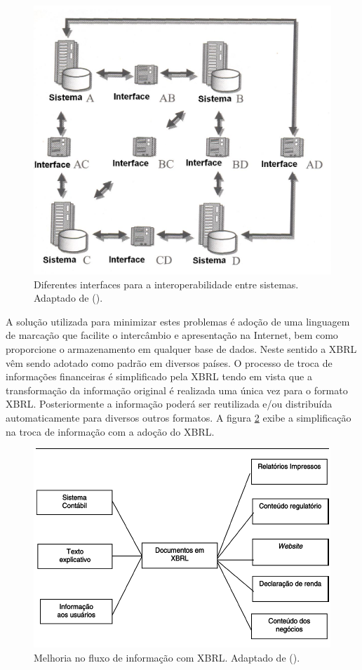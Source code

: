 \documentclass[msc,proposal]{ppgccufmg} %
\begin{document}
\begin{figure}[hbtp]
\centering
\includegraphics[width=.75\textwidth]{img/interfaces.png}
\caption{Diferentes interfaces para a interoperabilidade entre sistemas. Adaptado de (\cite{bergeron2004essentials}).}
\label{fig:fluxo_dados}
\end{figure}

A solução utilizada para minimizar estes problemas é adoção de uma linguagem de marcação que facilite o intercâmbio e apresentação na Internet, bem como proporcione o armazenamento em qualquer base de dados. Neste sentido a XBRL vêm sendo adotado como padrão em diversos países. O processo de troca de informações financeiras é simplificado pela XBRL tendo em vista que a transformação da informação original é realizada uma única vez para o formato XBRL. Posteriormente a informação poderá ser reutilizada e/ou distribuída automaticamente para diversos outros formatos. A figura \ref{fig:fluxo_info_xbrl} exibe a simplificação na troca de informação com a adoção do XBRL.

\begin{figure}[hbtp]
\centering
\includegraphics[width=.75\textwidth]{img/fluxo_info_xbrl.png}
\caption{Melhoria no fluxo de informação com XBRL. Adaptado de (\cite{hoffman2001xbrl}).}
\label{fig:fluxo_info_xbrl}
\end{figure}
\end{document}
